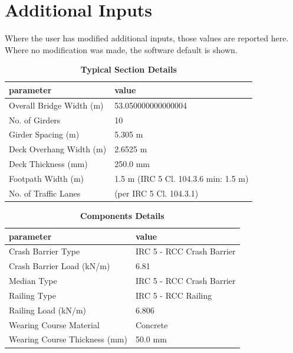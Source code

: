 \documentclass[12pt,a4paper]{report}
\numberwithin{table}{chapter}
\numberwithin{figure}{chapter}
\begin{document}
\newpage
\section{Additional Inputs}
\label{sec:additional-inputs}

Where the user has modified additional inputs, those values are reported here. Where no modification was made, the software default is shown.

\vspace{0.8cm}

\begin{longtable}{|L{5.5cm}|p{10.0cm}|}
\caption{\textbf{Typical Section Details}}
\hline
\textbf{parameter} & \textbf{value} \\
\hline
\textnormal{Overall Bridge Width (m)} & 53.050000000000004 \\[6pt]
\hline
\textnormal{No. of Girders} & 10 \\[6pt]
\hline
\textnormal{Girder Spacing (m)} & 5.305 m \\[6pt]
\hline
\textnormal{Deck Overhang Width (m)} & 2.6525 m \\[6pt]
\hline
\textnormal{Deck Thickness (mm)} & 250.0 mm \\[6pt]
\hline
\textnormal{Footpath Width (m)} & 1.5 m (IRC 5 Cl. 104.3.6 min: 1.5 m) \\[6pt]
\hline
\textnormal{No. of Traffic Lanes} &  (per IRC 5 Cl. 104.3.1) \\[6pt]
\hline
\end{longtable}

\vspace{0.8em}

\begin{longtable}{|L{5.5cm}|p{10.0cm}|}
\caption{\textbf{Components Details}}
\hline
\textbf{parameter} & \textbf{value} \\
\hline
\textnormal{Crash Barrier Type} & IRC 5 - RCC Crash Barrier \\[6pt]
\hline
\textnormal{Crash Barrier Load (kN/m)} & 6.81 \\[6pt]
\hline
\textnormal{Median Type} & IRC 5 - RCC Crash Barrier \\[6pt]
\hline

\textnormal{Railing Type} & IRC 5 - RCC Railing \\[6pt]
\hline
\textnormal{Railing Load (kN/m)} & 6.806 \\[6pt]
\hline
\textnormal{Wearing Course Material} & Concrete \\[6pt]
\hline
\textnormal{Wearing Course Thickness (mm)} & 50.0 mm \\[6pt]
\hline
\end{longtable}
\end{document}
